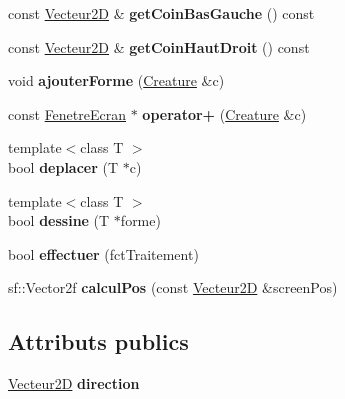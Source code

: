 \begin{DoxyCompactItemize}
const \mbox{\hyperlink{class_vecteur2_d}{Vecteur2D}} \& {\bfseries get\+Coin\+Bas\+Gauche} () const
\item 
\mbox{\label{class_fenetre_ecran_a3e19aa107adc34157e5220927232ca4c}} 
const \mbox{\hyperlink{class_vecteur2_d}{Vecteur2D}} \& {\bfseries get\+Coin\+Haut\+Droit} () const
\item 
\mbox{\label{class_fenetre_ecran_a5c5d369bfc2f4113ec98dc2cbed0976f}} 
void {\bfseries ajouter\+Forme} (\mbox{\hyperlink{class_creature}{Creature}} \&c)
\item 
\mbox{\label{class_fenetre_ecran_a0bb77db45c94f26297c75dcf193d5927}} 
const \mbox{\hyperlink{class_fenetre_ecran}{Fenetre\+Ecran}} $\ast$ {\bfseries operator+} (\mbox{\hyperlink{class_creature}{Creature}} \&c)
\item 
\mbox{\label{class_fenetre_ecran_a90ed854e37772b0fe9b4db9d2c59d58c}} 
{\footnotesize template$<$class T $>$ }\\bool {\bfseries deplacer} (T $\ast$c)
\item 
\mbox{\label{class_fenetre_ecran_a788eaad1bcd1edb0257aa1a7a843cd61}} 
{\footnotesize template$<$class T $>$ }\\bool {\bfseries dessine} (T $\ast$forme)
\item 
\mbox{\label{class_fenetre_ecran_a254a7e51115405bc9c3d573fdd6fe5a9}} 
bool {\bfseries effectuer} (fct\+Traitement)
\item 
\mbox{\label{class_fenetre_ecran_a2f4344b4bc71982db1c192ee45548aa1}} 
sf\+::\+Vector2f {\bfseries calcul\+Pos} (const \mbox{\hyperlink{class_vecteur2_d}{Vecteur2D}} \&screen\+Pos)
\end{DoxyCompactItemize}
\subsection*{Attributs publics}
\begin{DoxyCompactItemize}
\item 
\mbox{\label{class_fenetre_ecran_a6665b9f790eb76f887bd2850e2b1bed5}} 
\mbox{\hyperlink{class_vecteur2_d}{Vecteur2D}} {\bfseries direction}
\end{DoxyCompactItemize}
